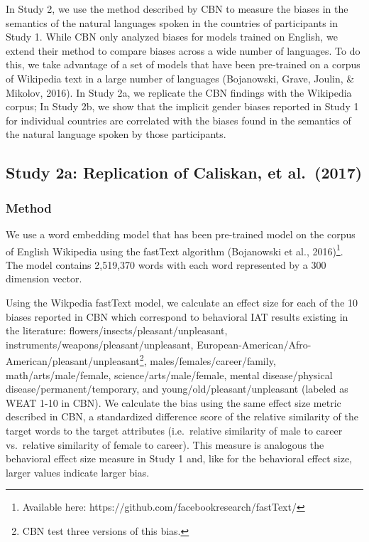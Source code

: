 \documentclass[10pt, letterpaper]{article}
\begin{document}
In Study 2, we use the method described by CBN to measure the biases in
the semantics of the natural languages spoken in the countries of
participants in Study 1. While CBN only analyzed biases for models
trained on English, we extend their method to compare biases across a
wide number of languages. To do this, we take advantage of a set of
models that have been pre-trained on a corpus of Wikipedia text in a
large number of languages (Bojanowski, Grave, Joulin, \& Mikolov, 2016).
In Study 2a, we replicate the CBN findings with the Wikipedia corpus; In
Study 2b, we show that the implicit gender biases reported in Study 1
for individual countries are correlated with the biases found in the
semantics of the natural language spoken by those participants.

\subsection{Study 2a: Replication of Caliskan, et
al.~(2017)}\label{study-2a-replication-of-caliskan-et-al.2017}

\subsubsection{Method}\label{method-1}

We use a word embedding model that has been pre-trained model on the
corpus of English Wikipedia using the fastText algorithm (Bojanowski et
al.,
2016)\footnote{Available here: https://github.com/facebookresearch/fastText/}.
The model contains 2,519,370 words with each word represented by a 300
dimension vector.

Using the Wikpedia fastText model, we calculate an effect size for each
of the 10 biases reported in CBN which correspond to behavioral IAT
results existing in the literature: flowers/insects/pleasant/unpleasant,
instruments/weapons/pleasant/unpleasant,
European-American/Afro-American/pleasant/unpleasant\footnote{CBN test three versions of this bias.},
males/females/career/family, math/arts/male/female,
science/arts/male/female, mental disease/physical
disease/permanent/temporary, and young/old/pleasant/unpleasant (labeled
as WEAT 1-10 in CBN). We calculate the bias using the same effect size
metric described in CBN, a standardized difference score of the relative
similarity of the target words to the target attributes (i.e.~relative
similarity of male to career vs.~relative similarity of female to
career). This measure is analogous the behavioral effect size measure in
Study 1 and, like for the behavioral effect size, larger values indicate
larger bias.
\end{document}

